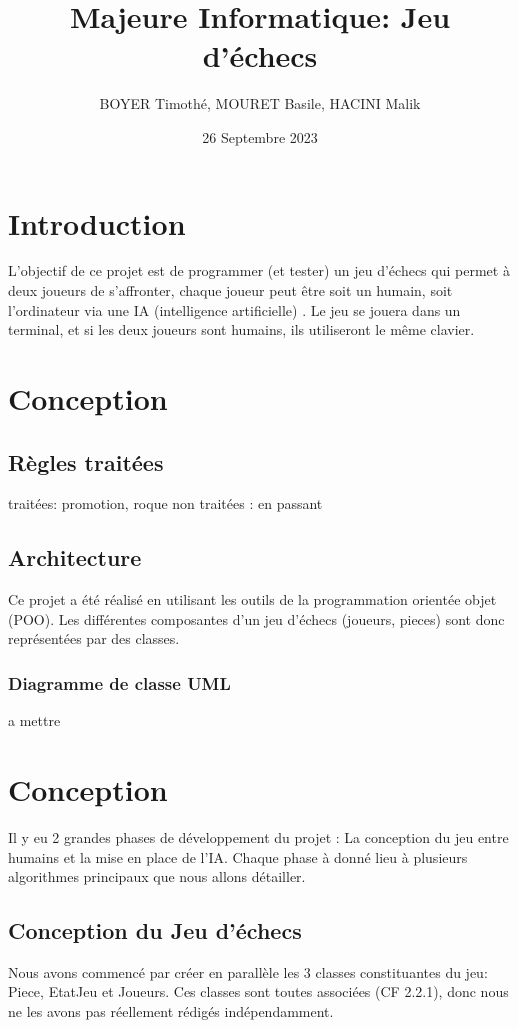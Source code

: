 \documentclass{article}
\title{\centering Majeure Informatique: 
Jeu d'échecs}
\author{BOYER Timothé, MOURET Basile, HACINI Malik}
\date{26 Septembre 2023}
\begin{document}
    
    

\maketitle
\tableofcontents{}

\section{Introduction}
L’objectif de ce projet est de programmer (et tester) un jeu
d’échecs qui permet à deux joueurs de s’affronter, 
chaque joueur peut être soit un humain, soit l’ordinateur via une IA
 (intelligence artificielle) . Le jeu se jouera dans un terminal, 
 et si les deux joueurs sont humains, ils utiliseront le même clavier.
\section{Conception}
\subsection{Règles traitées}
traitées: promotion, roque
non traitées : en passant
\subsection{Architecture}
Ce projet a été réalisé en utilisant les outils de la programmation orientée objet (POO).
Les différentes composantes d'un jeu d'échecs (joueurs, pieces) sont donc 
représentées par des classes.
\subsubsection{Diagramme de classe UML}
a mettre

\section{Conception}
Il y eu 2 grandes phases de développement du projet : La conception du jeu entre humains
et la mise en place de l'IA. Chaque phase à donné lieu à plusieurs algorithmes principaux que nous allons détailler.

\subsection{Conception du Jeu d'échecs}
Nous avons commencé par créer en parallèle les 3 classes constituantes du jeu:
Piece, EtatJeu et Joueurs. Ces classes sont toutes associées (CF 2.2.1), donc
nous ne les avons pas réellement rédigés indépendamment.
\end{document}
